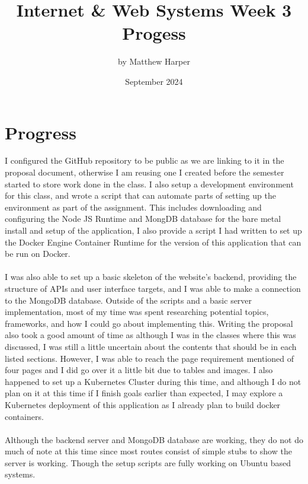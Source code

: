 \documentclass{article}
\title{Internet \& Web Systems Week 3 Progess}
\author{by Matthew Harper }
\date{September 2024}
\begin{document}
\maketitle
\section{Progress}
I configured the GitHub repository to be public as we are linking to it in the proposal document, otherwise I am reusing one I created before the semester started to store work done in the class. I also setup a development environment for this class, and wrote a script that can automate parts of setting up the environment as part of the assignment. This includes downloading and configuring the Node JS Runtime and MongDB database for the bare metal install and setup of the application, I also provide a script I had written to set up the Docker Engine Container Runtime for the version of this application that can be run on Docker. \\\\
I was also able to set up a basic skeleton of the website's backend, providing the structure of APIs and user interface targets, and I was able to make a connection to the MongoDB database. Outside of the scripts and a basic server implementation, most of my time was spent researching potential topics, frameworks, and how I could go about implementing this. Writing the proposal also took a good amount of time as although I was in the classes where this was discussed, I was still a little uncertain about the contents that should be in each listed sections. However, I was able to reach the page requirement mentioned of four pages and I did go over it a little bit due to tables and images. I also happened to set up a Kubernetes Cluster during this time, and although I do not plan on it at this time if I finish goals earlier than expected, I may explore a Kubernetes deployment of this application as I already plan to build docker containers.\\\\
Although the backend server and MongoDB database are working, they do not do much of note at this time since most routes consist of simple stubs to show the server is working. Though the setup scripts are fully working on Ubuntu based systems. 
\end{document}

